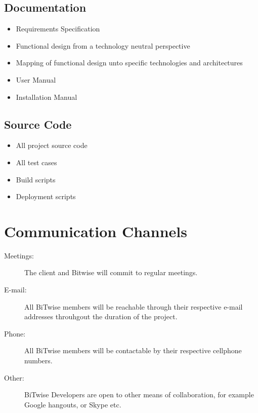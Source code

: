 \documentclass[a4paper]{article}
\begin{document}
    \subsection{Documentation}

			\begin{itemize}
				\item Requirements Specification
				\item Functional design from a technology neutral perspective
				\item Mapping of functional design unto specific technologies and architectures
				\item User Manual
				\item Installation Manual
			\end{itemize}

		\subsection{Source Code}

			\begin{itemize}
				\item All project source code
				\item All test cases
				\item Build scripts
				\item Deployment scripts
			\end{itemize}

	\section{Communication Channels}
    
	\begin{description}
			\item [Meetings:] The client and Bitwise will commit to regular meetings.
			\item [E-mail:] All BiTwise members will be reachable through their respective e-mail addresses 				throuhgout the duration of the project.
			\item [Phone:] All BiTwise members will be contactable by their respective cellphone numbers.
			\item [Other:] BiTwise Developers are open to other means of collaboration, for example Google 					hangouts, or Skype etc.
	\end{description}
    
    
\end{document}
